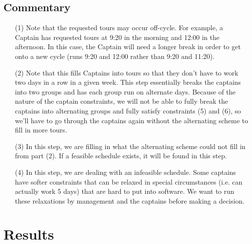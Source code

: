 \documentclass[12pt]{article}
\begin{document}
\subsection*{Commentary}
\begin{itemize}

\item[(1)] Note that the requested tours may occur off-cycle. For example, a Captain has requested tours at 9:20 in the morning and 12:00 in the afternoon. In this case, the Captain will need a longer break in order to get onto a new cycle (runs 9:20 and 12:00 rather than 9:20 and 11:20). 

\item[(2)] Note that this fills Captains into tours so that they don't have to work two days in a row in a given week. This step essentially breaks the captains into two groups and has each group run on alternate days. Because of the nature of the captain constraints, we will not be able to fully break the captains into alternating groups and fully satisfy constraints (5) and (6), so we'll have to go through the captains again without the alternating scheme to fill in more tours.

\item[(3)] In this step, we are filling in what the alternating scheme could not fill in from part (2). If a feasible schedule exists, it will be found in this step.

\item[(4)] In this step, we are dealing with an infeasible schedule. Some captains have softer constraints that can be relaxed in special circumstances (i.e. can actually work 5 days) that are hard to put into software. We want to run these relaxations by management and the captains before making a decision. 

\end{itemize}

\section*{Results} 
\end{document}
